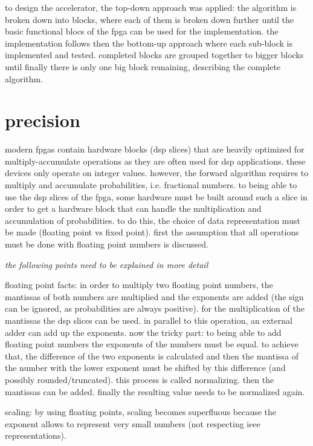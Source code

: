 \documentclass[mscthesis]{usiinfthesis}
\begin{document}
to design the accelerator, the top-down approach was applied: the algorithm is
broken down into blocks, where each of them is broken down further until the
basic functional blocs of the fpga can be used for the implementation. the
implementation follows then the bottom-up approach where each sub-block is
implemented and tested. completed blocks are grouped together to bigger blocks
until finally there is only one big block remaining, describing the complete
algorithm.

\section{precision}

modern fpgas contain hardware blocks (dsp slices) that are heavily optimized
for multiply-accumulate operations as they are often used for dsp applications.
these devices only operate on integer values. however, the forward algorithm
requires to multiply and accumulate probabilities, i.e. fractional numbers. to
being able to use the dsp slices of the fpga, some hardware must be built
around such a slice in order to get a hardware block that can handle the
multiplication and accumulation of probabilities. to do this, the choice of
data representation must be made (floating point vs fixed point). first the
assumption that all operations must be done with floating point numbers is
discussed.

\emph{\color{red}the following points need to be explained in more detail}

floating point facts:
in order to multiply two floating point numbers, the mantissas of
both numbers are multiplied and the exponents are added (the sign can be
ignored, as probabilities are always positive). for the multiplication of the
mantissas the dsp slices can be used. in parallel to this operation, an
external adder can add up the exponents. now the tricky part: to being able to
add floating point numbers the exponents of the numbers must be equal. to
achieve that, the difference of the two exponents is calculated and then the
mantissa of the number with the lower exponent must be shifted by this
difference (and possibly rounded/truncated). this process is called
normalizing. then the mantissas can be added. finally the resulting value
needs to be normalized again.

scaling: by using floating points, scaling becomes superfluous because the
exponent allows to represent very small numbers (not respecting ieee
representations).
\end{document}
